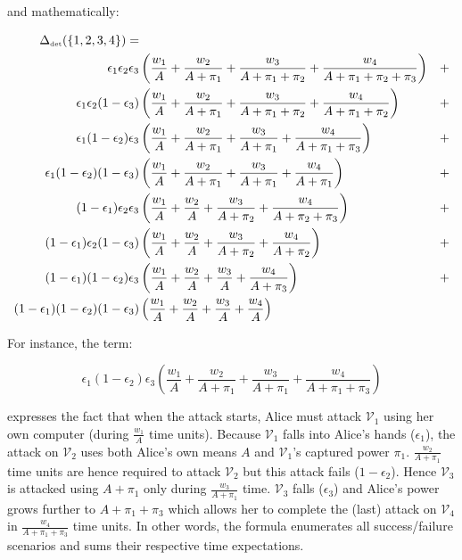 \documentclass[11pt]{llncs}
\begin{document}
and mathematically:

\begin{alignat}{4}
\Delta_{\mbox{{\tiny det}}}(\{1,2,3,4\})= &&\nonumber\\
\epsilon_1 \epsilon_2 \epsilon_3 &\left(\frac{w_1}A+\frac{w_2}{A+\pi_1}+\frac{w_3}{A+\pi_1+\pi_2}+\frac{w_4}{A+\pi_1+\pi_2+\pi_3}\right)&+\nonumber\\
\epsilon_1 \epsilon_2 (1-\epsilon_3) &\left(\frac{w_1}A+\frac{w_2}{A+\pi_1}+\frac{w_3}{A+\pi_1+\pi_2}+\frac{w_4}{A+\pi_1+\pi_2}\right)&+ \nonumber\\
\epsilon_1 (1-\epsilon_2) \epsilon_3 &\left(\frac{w_1}A+\frac{w_2}{A+\pi_1}+\frac{w_3}{A+\pi_1}+\frac{w_4}{A+\pi_1+\pi_3}\right)&+ \nonumber\\
\epsilon_1 (1-\epsilon_2) (1-\epsilon_3) &\left(\frac{w_1}A+\frac{w_2}{A+\pi_1}+\frac{w_3}{A+\pi_1}+\frac{w_4}{A+\pi_1}\right)&+ \nonumber\\
(1-\epsilon_1) \epsilon_2 \epsilon_3 &\left(\frac{w_1}A+\frac{w_2}A+\frac{w_3}{A+\pi_2}+\frac{w_4}{A+\pi_2+\pi_3}\right)&+ \nonumber\\
(1-\epsilon_1) \epsilon_2 (1-\epsilon_3) &\left(\frac{w_1}A+\frac{w_2}A+\frac{w_3}{A+\pi_2}+\frac{w_4}{A+\pi_2}\right)&+\nonumber\\
(1-\epsilon_1) (1-\epsilon_2) \epsilon_3 &\left(\frac{w_1}A+\frac{w_2}A+\frac{w_3}A+\frac{w_4}{A+\pi_3}\right)&+\nonumber\\
(1-\epsilon_1) (1-\epsilon_2) (1-\epsilon_3) &\left(\frac{w_1}A+\frac{w_2}A+\frac{w_3}A+\frac{w_4}A\right) &\nonumber
\end{alignat}

For instance, the term:

$$\epsilon_1 (1-\epsilon_2) \epsilon_3 \left(\frac{w_1}A+\frac{w_2}{A+\pi_1}+\frac{w_3}{A+\pi_1}+\frac{w_4}{A+\pi_1+\pi_3}\right)$$

expresses the fact that when the attack starts, Alice must attack $\mathcal{V}_1$ using her own computer (during $\frac{w_1}A$ time units). Because $\mathcal{V}_1$ falls into Alice's hands ($\epsilon_1$), the attack on $\mathcal{V}_2$ uses both Alice's own means $A$ and $\mathcal{V}_1$'s captured power $\pi_1$. $\frac{w_2}{A+\pi_1}$ time units are hence required to attack $\mathcal{V}_2$ but this attack fails ($1-\epsilon_2$). Hence $\mathcal{V}_3$ is attacked using $A+\pi_1$ only during $\frac{w_3}{A+\pi_1}$ time. $\mathcal{V}_3$ falls ($\epsilon_3$) and Alice's power grows further to $A+\pi_1+\pi_3$ which allows her to complete the (last) attack on $\mathcal{V}_4$ in $\frac{w_4}{A+\pi_1+\pi_3}$ time units. In other words, the formula enumerates all success/failure scenarios and sums their respective time expectations.\smallskip
\end{document}
